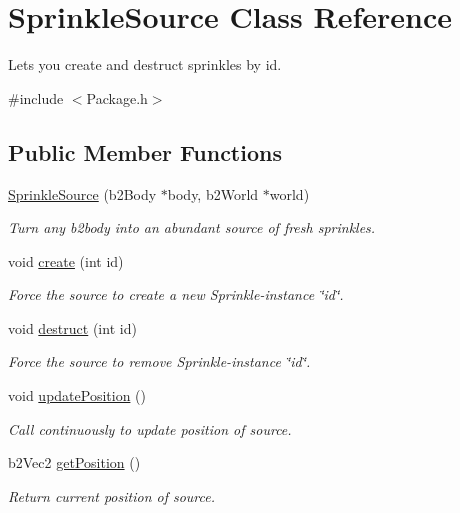 \hypertarget{classSprinkleSource}{\section{Sprinkle\-Source Class Reference}
\label{classSprinkleSource}
}


Lets you create and destruct sprinkles by id.  




{\ttfamily \#include $<$Package.\-h$>$}

\subsection*{Public Member Functions}
\begin{DoxyCompactItemize}
\item 
\hyperlink{classSprinkleSource_a824b0a6fdf330e751eb41b4debb3e169}{Sprinkle\-Source} (b2\-Body $\ast$body, b2\-World $\ast$world)
\begin{DoxyCompactList}\small\item\em Turn any b2body into an abundant source of fresh sprinkles. \end{DoxyCompactList}\item 
void \hyperlink{classSprinkleSource_a46a3ee06b8ba7576d4c15a0da597f317}{create} (int id)
\begin{DoxyCompactList}\small\item\em Force the source to create a new Sprinkle-\/instance \char`\"{}id\char`\"{}. \end{DoxyCompactList}\item 
void \hyperlink{classSprinkleSource_aca356ad2512a551436f0386c69f1c7cc}{destruct} (int id)
\begin{DoxyCompactList}\small\item\em Force the source to remove Sprinkle-\/instance \char`\"{}id\char`\"{}. \end{DoxyCompactList}\item 
void \hyperlink{classSprinkleSource_a57aee0f31a931c0e3a71719539d4d28d}{update\-Position} ()
\begin{DoxyCompactList}\small\item\em Call continuously to update position of source. \end{DoxyCompactList}\item 
b2\-Vec2 \hyperlink{classSprinkleSource_a7466f70cd45495df332777e4b179422c}{get\-Position} ()
\begin{DoxyCompactList}\small\item\em Return current position of source. \end{DoxyCompactList}\end{DoxyCompactItemize}
